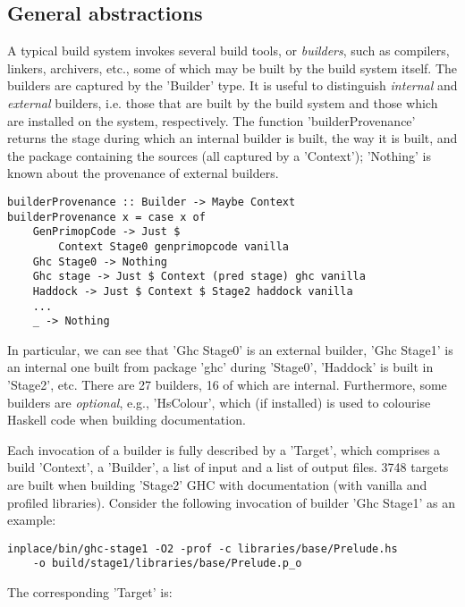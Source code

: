 \subsection{General abstractions}

A typical build system invokes several build tools, or \emph{builders}, such as
compilers, linkers, archivers, etc., some of which may be built by the
build system itself. The builders are captured by the \lst'Builder' type. It
is useful to distinguish \emph{internal} and \emph{external} builders, i.e.
those that are built by the build system and those which are installed on the
system, respectively. The function \lst'builderProvenance' returns the stage
during which an internal builder is built, the way it is built, and the package
containing the sources (all captured by a \lst'Context'); \lst'Nothing' is
known about the provenance of external builders.

\begin{lstlisting}
builderProvenance :: Builder -> Maybe Context
builderProvenance x = case x of
    GenPrimopCode -> Just $
        Context Stage0 genprimopcode vanilla
    Ghc Stage0 -> Nothing
    Ghc stage -> Just $ Context (pred stage) ghc vanilla
    Haddock -> Just $ Context $ Stage2 haddock vanilla
    ...
    _ -> Nothing
\end{lstlisting}

In particular, we can see that \lst'Ghc Stage0' is an external builder,
\lst'Ghc Stage1' is an internal one built from package \lst'ghc'
during \lst'Stage0', \lst'Haddock' is built in \lst'Stage2', etc. There are
27 builders, 16 of which are internal. Furthermore, some builders are
\emph{optional}, e.g., \lst'HsColour', which (if installed) is used to
colourise Haskell code when building documentation.

Each invocation of a builder is fully described by a \lst'Target', which
comprises a build \lst'Context', a \lst'Builder', a list of input and
a list of output files. 3748 targets are built when building \lst'Stage2' GHC
with documentation (with vanilla and profiled libraries). Consider the following
invocation of builder \lst'Ghc Stage1' as an example:

\begin{lstlisting}
inplace/bin/ghc-stage1 -O2 -prof -c libraries/base/Prelude.hs
    -o build/stage1/libraries/base/Prelude.p_o
\end{lstlisting}

\noindent The corresponding \lst'Target' is:

